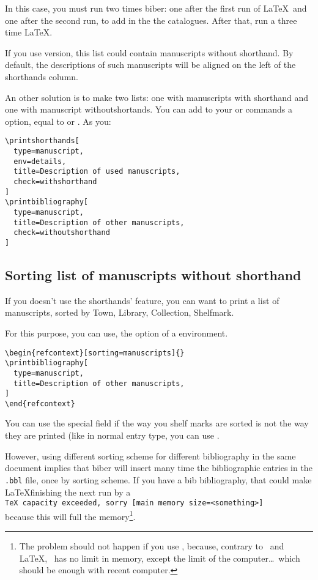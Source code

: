 \documentclass{ltxdockit}[2011/03/25]
\begin{document}
In this case, you must run two times biber: one after the first run of \LaTeX\ and one after the second run, to add in the  the catalogues. After that, run a three time \LaTeX.

If you use  version, this list could contain manuscripts without shorthand. By default, the descriptions of such manuscripts will be aligned on the left of the shorthands column. 

\label{bibcheck}An other solution is to make two lists: one with manuscripts with shorthand and one with manuscript withoutshortands. You can add to your  or   commands a  option, equal to  or . As you:
\begin{verbatim}
\printshorthands[
  type=manuscript,
  env=details,
  title=Description of used manuscripts,
  check=withshorthand
]
\printbibliography[
  type=manuscript,
  title=Description of other manuscripts,
  check=withoutshorthand
]
\end{verbatim}

\subsection{Sorting list of manuscripts without shorthand}

\label{sorting} If you doesn't use the shorthands' feature, you can want to print a list of manuscripts, sorted by Town, Library, Collection, Shelfmark.

For this purpose, you can use, the option  of a  environment. 

\begin{verbatim}
\begin{refcontext}[sorting=manuscripts]{}
\printbibliography[
  type=manuscript,
  title=Description of other manuscripts,
]
\end{refcontext}
\end{verbatim}

You can use the special field  if the way you shelf marks are sorted is not the way they are printed (like in normal entry type, you can use .

However, using different sorting scheme for different bibliography in the same document implies that biber will insert many time the bibliographic entries in the \verb+.bbl+ file, once by sorting scheme.
If you have a bib bibliography, that could make \LaTeX finishing the next run by a\\ \verb`TeX capacity exceeded, sorry [main memory size=<something>]`
\\
because this will full the memory\footnote{The problem should not happen if you use \LuaLaTeX, because, contrary to \XeLaTeX\ and \LaTeX, \LuaLaTeX\ has no limit in memory, except the limit of the computer\ldots\ which should be enough with recent computer.}.
\end{document}

